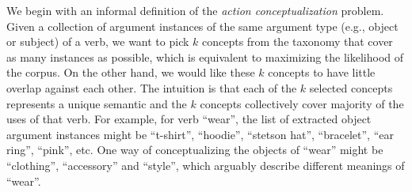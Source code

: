 We begin with an informal definition of the
{\em action conceptualization} problem.
Given a collection of argument instances of the same argument
type (e.g., object or subject) of a
verb, %
we want to pick $k$ concepts from the taxonomy
that cover as many instances as possible, which
is equivalent to maximizing the likelihood of the corpus.
On the other hand, we would like these $k$ concepts to
have little overlap against each other.
The intuition is that each of the $k$ selected concepts represents a unique
semantic and the $k$ concepts collectively cover majority of the 
uses of that verb.
For example, for verb ``wear'', the list of extracted
object argument instances might be ``t-shirt'', ``hoodie'', ``stetson hat'', ``bracelet'',
``ear ring'', ``pink'', etc. One way of conceptualizing the objects of
``wear'' might be ``clothing'', ``accessory'' and ``style'', which arguably
describe different meanings of ``wear''.

